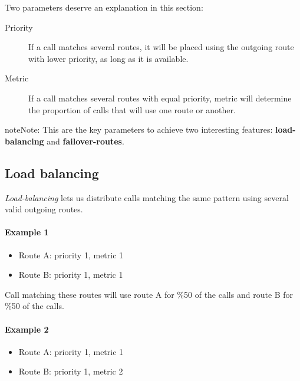 \documentclass[letterpaper,10pt,english]{sphinxmanual}
\begin{document}
\label{external_outgoing_calls/call_routing:routes-metrics}
Two parameters deserve an explanation in this section:
\begin{description}
\item[{Priority}] \leavevmode{}\label{external_outgoing_calls/call_routing:term-priority}
If a call matches several routes, it will be placed using the outgoing
route with lower priority, as long as it is available.

\item[{Metric}] \leavevmode{}\label{external_outgoing_calls/call_routing:term-metric}
If a call matches several routes with equal priority, metric will determine
the proportion of calls that will use one route or another.

\end{description}

\begin{notice}{note}{Note:}
This are the key parameters to achieve two interesting features:
\textbf{load-balancing} and \textbf{failover-routes}.
\end{notice}


\subsection{Load balancing}
\label{external_outgoing_calls/call_routing:load-balancing}
\emph{Load-balancing} lets us distribute calls matching the same pattern using
several valid outgoing routes.
\paragraph{Example 1}
\begin{itemize}
\item {} 
Route A: priority 1, metric 1

\item {} 
Route B: priority 1, metric 1

\end{itemize}

Call matching these routes will use route A for \%50 of the calls and route B for
\%50 of the calls.
\paragraph{Example 2}
\begin{itemize}
\item {} 
Route A: priority 1, metric 1

\item {} 
Route B: priority 1, metric 2

\end{itemize}
\end{document}
